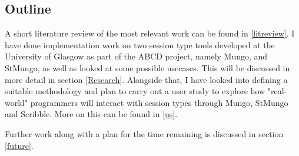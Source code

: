 \subsection{Outline}

 A short literature review of the most relevant work can be found in \ref{litreview}. I have done implementation work on two session type tools developed at the University of Glasgow as part of the ABCD project\cite{abcd}, namely Mungo, and StMungo\cite{kouzapas16}, as well as looked at some possible usecases. This will be discussed in more detail in section \ref{Research}. Alongside that, I have looked into defining a suitable methodology and plan to carry out a user study to explore how "real-world" programmers will interact with session types through Mungo, StMungo and Scribble. More on this can be found in \ref{us}.

Further work along with a plan for the time remaining is discussed in section \ref{future}.
